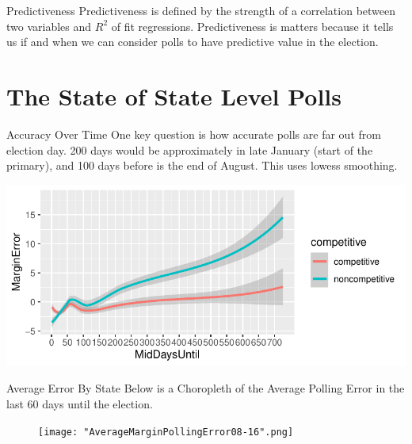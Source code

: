 \documentclass{beamer}\usepackage[]{graphicx}\usepackage[]{color}
\makeatletter
\def\maxwidth{ %
  \ifdim\Gin@nat@width>\linewidth
    \linewidth
  \else
    \Gin@nat@width
  \fi
}
\newenvironment{knitrout}{}{} %
\makeatother
\begin{document}
\begin{frame}{Predictiveness}
Predictiveness is defined by the strength of a correlation between two variables and $R^2$ of fit regressions. Predictiveness is matters because it tells us if and when we can consider polls to have predictive value in the election.  
\end{frame}

\section{The State of State Level Polls}
\begin{frame}{Accuracy Over Time}
One key question is how accurate polls are far out from election day. 200 days would be approximately in late January (start of the primary), and 100 days before is the end of August. This uses lowess smoothing. 

\begin{knitrout}
\color{fgcolor}
\includegraphics[width=\maxwidth]{figure/unnamed-chunk-2-1} 

\end{knitrout}
\end{frame}

\begin{frame}{Average Error By State}
Below is a Choropleth of the Average Polling Error in the last 60 days until the election.
\begin{figure}[h]
       \centering
        \texttt{[image: "AverageMarginPollingError08-16".png]}
\end{figure}
\end{frame}
\end{document}
